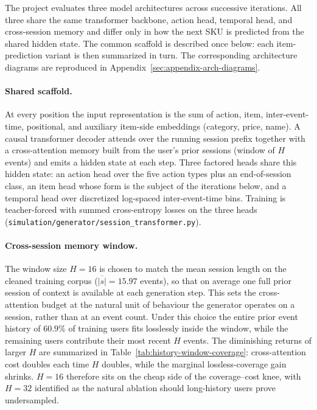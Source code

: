 \documentclass[sigconf,nonacm]{acmart}
\begin{document}
The project evaluates three model architectures across successive
iterations. All three share the same transformer backbone, action head,
temporal head, and cross-session memory and differ only in how the next
SKU is predicted from the shared hidden state. The common scaffold is
described once below: each item-prediction variant is then summarized in
turn. The corresponding architecture diagrams are reproduced in
Appendix~\ref{sec:appendix-arch-diagrams}.

\paragraph{Shared scaffold.}
At every position the input representation is the sum of action, item,
inter-event-time, positional, and auxiliary item-side embeddings (category,
price, name). A causal transformer decoder attends over the running session
prefix together with a cross-attention memory built from the user's prior
sessions (window of $H$ events) and emits a hidden state at each step.
Three factored heads share this hidden state: an action head over the five
action types plus an end-of-session class, an item head whose form is the
subject of the iterations below, and a temporal head over discretized
log-spaced inter-event-time bins. Training is teacher-forced with summed
cross-entropy losses on the three heads
(\texttt{simulation/generator/session\_transformer.py}).

\paragraph{Cross-session memory window.}
The window size $H = 16$ is chosen to match the mean session length on
the cleaned training corpus ($\overline{|s|} = 15.97$ events), so that
on average one full prior session of context is available at each
generation step. This sets the cross-attention budget at the natural
unit of behaviour the generator operates on a session, rather
than at an event count. Under this choice the entire prior
event history of $60.9\%$ of training users fits losslessly inside the
window, while the remaining users contribute their most recent $H$
events. The diminishing returns of larger $H$ are summarized in
Table~\ref{tab:history-window-coverage}: cross-attention cost doubles
each time $H$ doubles, while the marginal lossless-coverage gain
shrinks. $H = 16$ therefore sits on the cheap side of the
coverage--cost knee, with $H = 32$ identified as the natural ablation
should long-history users prove undersampled.
\end{document}
